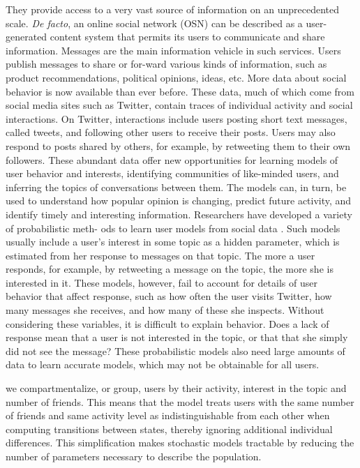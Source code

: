 \documentclass[twocolumn]{svjour3}          %
\begin{document}
They provide access to a very vast source of information on an unprecedented scale. \textit{De facto}, an online social network (OSN) can be described as a user-generated content system that permits its users to communicate and share information.
Messages are the main information vehicle in such services. Users publish messages to share or for-ward various kinds of information, such as product recommendations, political opinions, ideas, etc.
More data about social behavior is now available than ever
before. These data, much of which come from social media sites such as Twitter, contain traces of individual activity and social interactions. On Twitter, interactions include users posting short text messages, called tweets, and following other users to receive their posts. Users may also respond to posts shared by others, for example, by retweeting them to their own followers. These abundant data offer new opportunities for learning models of user behavior and interests, identifying communities of like-minded users, and inferring the topics of conversations between them. The models can, in turn, be used to understand how popular opinion is changing, predict future activity, and identify timely and interesting information.
Researchers have developed a variety of probabilistic meth-
ods to learn user models from social data \cite{chua2013generative,kang2013lda,wang2011collaborative,purushotham2012collaborative}.
Such models usually include a user’s interest in some topic as a hidden parameter, which is estimated from her response to messages on that topic. The more a user responds, for example, by retweeting a message on the topic, the more she is interested in it. These models, however, fail to account for details of user behavior that affect response, such as how often the user visits Twitter, how many messages she receives, and how many of these she inspects. Without considering these variables, it is difficult to explain behavior. Does a lack of response mean that a user is not interested in the topic, or
that that she simply did not see the message? These probabilistic models also need large amounts of data to learn accurate models, which may not be obtainable for all users.

we compartmentalize, or group, users by their activity, interest in the topic and number of friends. This means that the model treats users with the same number of friends and same activity level as indistinguishable from each other when computing transitions between states, thereby ignoring additional individual differences. This simplification makes stochastic models tractable by reducing the number of parameters necessary to describe the population.
\end{document}
